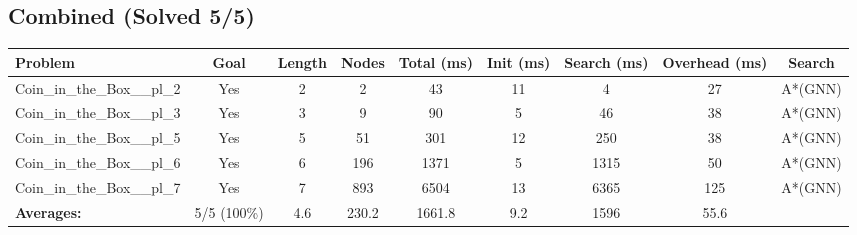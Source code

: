 \documentclass{article}
\begin{document}
\subsection*{Combined (Solved 5/5)}
\begin{tabular}{lcccccccc}
\toprule
Problem & Goal & Length & Nodes & Total (ms) & Init (ms) & Search (ms) & Overhead (ms) & Search \\
\midrule
Coin\_in\_the\_Box\_\_pl\_2 & Yes & 2 & 2 & 43 & 11 & 4 & 27 & A*(GNN) \\
Coin\_in\_the\_Box\_\_pl\_3 & Yes & 3 & 9 & 90 & 5 & 46 & 38 & A*(GNN) \\
Coin\_in\_the\_Box\_\_pl\_5 & Yes & 5 & 51 & 301 & 12 & 250 & 38 & A*(GNN) \\
Coin\_in\_the\_Box\_\_pl\_6 & Yes & 6 & 196 & 1371 & 5 & 1315 & 50 & A*(GNN) \\
Coin\_in\_the\_Box\_\_pl\_7 & Yes & 7 & 893 & 6504 & 13 & 6365 & 125 & A*(GNN) \\
\textbf{Averages:} & 5/5 (100\%) & 4.6 & 230.2 & 1661.8 & 9.2 & 1596 & 55.6 & \\
\bottomrule
\end{tabular}
\\[0.7cm]
\end{document}
